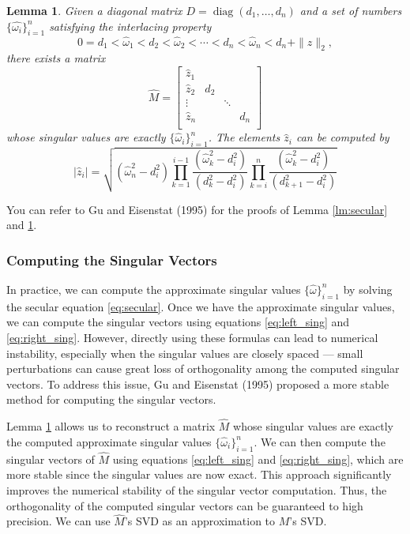 \documentclass[12pt]{article}
\newcommand{\op}{\operatorname}
\newtheorem{lemma}[theorem]{Lemma}
\begin{document}
\begin{lemma} \label{lm:reconstruct}
    Given a diagonal matrix \(D = \op{diag}(d_1, \ldots, d_n)\) and a set of numbers \(\{\hat{\omega_i}\}_{i=1}^{n}\) satisfying the interlacing property
    \[
        0 = d_1 < \hat{\omega}_1 < d_2 < \hat{\omega}_2 < \cdots < d_n < \hat{\omega}_n < d_n + \|z\|_2,
    \]
    there exists a matrix
    \[
        \hat{M} = \begin{bmatrix}
            \hat{z}_1 \\
            \hat{z}_2 & d_2 \\
            \vdots & & \ddots \\
            \hat{z}_n & & & d_n \\
        \end{bmatrix}
    \]
    whose singular values are exactly \(\{\hat{\omega}_i\}_{i=1}^{n}\). The elements \(\hat{z}_i\) can be computed by
    \begin{equation} \label{eq:rank1}
        |\hat{z}_i| = \sqrt{
            (\hat{\omega}_n^2 - d_i^2) \prod_{k=1}^{i-1} \frac{(\hat{\omega}_k^2 - d_i^2)}{(d_k^2 - d_i^2)} \prod_{k=i}^{n} \frac{(\hat{\omega}_k^2 - d_i^2)}{(d_{k+1}^2 - d_i^2)}
        }
    \end{equation}
\end{lemma}

You can refer to Gu and Eisenstat (1995) for the proofs of Lemma \ref{lm:secular} and \ref{lm:reconstruct}.

\subsubsection{Computing the Singular Vectors}

In practice, we can compute the approximate singular values \(\{\hat{\omega}\}_{i=1}^{n}\) by solving the secular equation \eqref{eq:secular}. Once we have the approximate singular values, we can compute the singular vectors using equations \eqref{eq:left_sing} and \eqref{eq:right_sing}. However, directly using these formulas can lead to numerical instability, especially when the singular values are closely spaced --- small perturbations can cause great loss of orthogonality among the computed singular vectors. To address this issue, Gu and Eisenstat (1995) proposed a more stable method for computing the singular vectors.

Lemma \ref{lm:reconstruct} allows us to reconstruct a matrix \(\hat{M}\) whose singular values are exactly the computed approximate singular values \(\{\hat{\omega}_i\}_{i=1}^{n}\). We can then compute the singular vectors of \(\hat{M}\) using equations \eqref{eq:left_sing} and \eqref{eq:right_sing}, which are more stable since the singular values are now exact. This approach significantly improves the numerical stability of the singular vector computation. Thus, the orthogonality of the computed singular vectors can be guaranteed to high precision. We can use \(\hat{M}\)'s SVD as an approximation to \(M\)'s SVD.
\end{document}

